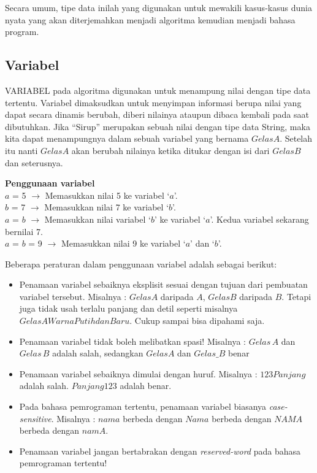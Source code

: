 Secara umum, tipe data inilah yang digunakan untuk mewakili kasus-kasus dunia nyata yang akan diterjemahkan menjadi algoritma kemudian menjadi bahasa program. 

\subsection{Variabel}
VARIABEL pada algoritma digunakan untuk menampung nilai dengan tipe data tertentu. Variabel dimaksudkan untuk menyimpan informasi berupa nilai yang dapat secara dinamis berubah, diberi nilainya ataupun dibaca kembali pada saat dibutuhkan. Jika ``Sirup'' merupakan sebuah nilai dengan tipe data String, maka kita dapat menampungnya dalam sebuah variabel yang bernama $GelasA$. Setelah itu nanti $GelasA$ akan berubah nilainya ketika ditukar dengan isi dari $GelasB$ dan seterusnya.
\begin{contoh}
	\textbf{Penggunaan variabel}\\
	$a$ = 5 $\rightarrow$ Memasukkan nilai 5 ke variabel `$a$'.\\
	$b$ = 7 $\rightarrow$ Memasukkan nilai 7 ke variabel `$b$'.\\
	$a$ = $b$ $\rightarrow$ Memasukkan nilai variabel `$b$' ke variabel `$a$'. Kedua variabel sekarang bernilai 7.\\
	$a$ = $b$ = 9 $\rightarrow$ Memasukkan nilai 9 ke variabel `$a$' dan `$b$'.\\
\end{contoh}

Beberapa peraturan dalam penggunaan variabel adalah sebagai berikut: 
\begin{itemize}
	\item Penamaan variabel sebaiknya eksplisit sesuai dengan tujuan dari pembuatan variabel tersebut. Misalnya : $GelasA$ daripada $A$, $GelasB$ daripada $B$. Tetapi juga tidak usah terlalu panjang dan detil seperti misalnya $GelasAWarnaPutihdanBaru$. Cukup sampai bisa dipahami saja.
	\item	Penamaan variabel tidak boleh melibatkan spasi!  Misalnya : $Gelas\,A$ dan $Gelas\,B$ adalah salah, sedangkan $GelasA$ dan $Gelas\_B$ benar
	\item	Penamaan variabel sebaiknya dimulai dengan huruf. Misalnya : $123Panjang$ adalah salah. $Panjang123$ adalah benar. 
	\item	Pada bahasa pemrograman tertentu, penamaan variabel biasanya \textit{case-sensitive}. Misalnya : $nama$ berbeda dengan $Nama$ berbeda dengan $NAMA$ berbeda dengan $namA$.
	\item	Penamaan variabel jangan bertabrakan dengan \textit{reserved-word} pada bahasa pemrograman tertentu!
\end{itemize}

